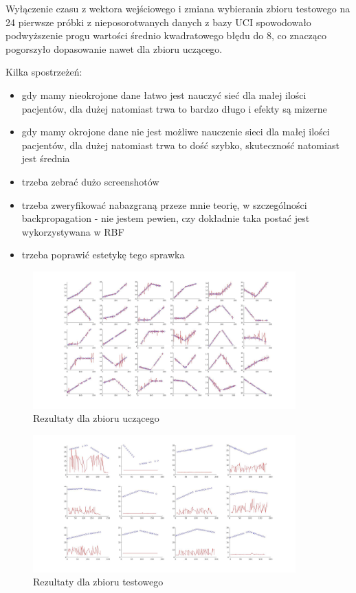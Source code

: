 \documentclass[12pt]{article}
\begin{document}
Wyłączenie czasu z wektora wejściowego i zmiana wybierania zbioru testowego na 24 pierwsze próbki z nieposorotwanych danych z bazy UCI spowodowało podwyższenie progu wartości średnio kwadratowego błędu do 8, co znacząco pogorszyło dopasowanie nawet dla zbioru uczącego.

\newpage

Kilka spostrzeżeń:

\begin{itemize}
\item gdy mamy nieokrojone dane łatwo jest nauczyć sieć dla małej ilości pacjentów, dla dużej natomiast trwa to bardzo długo i efekty są mizerne
\item gdy mamy okrojone dane nie jest możliwe nauczenie sieci dla małej ilości pacjentów, dla dużej natomiast trwa to dość szybko, skuteczność natomiast jest średnia
\item trzeba zebrać dużo screenshotów
\item trzeba zweryfikować nabazgraną przeze mnie teorię, w szczególności backpropagation - nie jestem pewien, czy dokładnie taka postać jest wykorzystywana w RBF
\item trzeba poprawić estetykę tego sprawka
\end{itemize}



\begin{figure}
\centering
	\includegraphics[width=0.90\textwidth]{fig1.jpg}\par\vspace{1cm}
\caption{Rezultaty dla zbioru uczącego}
	\label{fig:features}
\end{figure}

\begin{figure}
\centering
	\includegraphics[width=0.90\textwidth]{fig2.jpg}\par\vspace{1cm}
\caption{Rezultaty dla zbioru testowego}
	\label{fig:features}
\end{figure}
\end{document}
